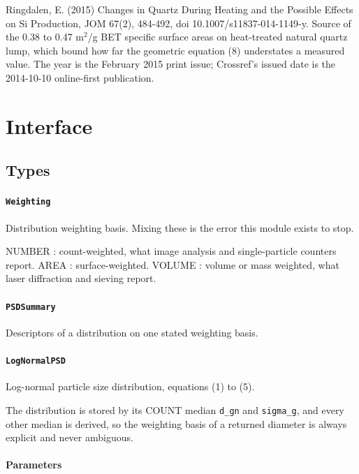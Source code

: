 \documentclass[10pt,a4paper,twoside]{report}
\begin{document}
Ringdalen, E. (2015) Changes in Quartz During Heating and the Possible Effects on Si Production, JOM 67(2), 484-492, doi 10.1007/s11837-014-1149-y. Source of the 0.38 to 0.47 m$^{2}$/g BET specific surface areas on heat-treated natural quartz lump, which bound how far the geometric equation (8) understates a measured value. The year is the February 2015 print issue; Crossref's issued date is the 2014-10-10 online-first publication.

\section{Interface}

\subsection*{Types}

\paragraph{\texttt{Weighting}}

Distribution weighting basis. Mixing these is the error this module exists to stop.

NUMBER  : count-weighted, what image analysis and single-particle counters report. AREA    : surface-weighted. VOLUME  : volume or mass weighted, what laser diffraction and sieving report.

\paragraph{\texttt{PSDSummary}}

Descriptors of a distribution on one stated weighting basis.

\paragraph{\texttt{LogNormalPSD}}

Log-normal particle size distribution, equations (1) to (5).

The distribution is stored by its COUNT median \texttt{d\_gn} and \texttt{sigma\_g}, and every other median is derived, so the weighting basis of a returned diameter is always explicit and never ambiguous.

\paragraph*{Parameters}
\end{document}

